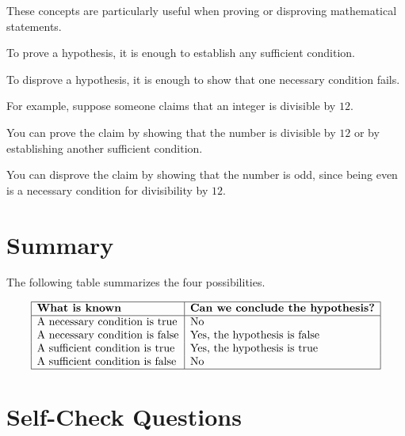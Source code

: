 \documentclass{essay}
\begin{document}
These concepts are particularly useful when proving or disproving mathematical statements.

To prove a hypothesis, it is enough to establish any sufficient condition.

To disprove a hypothesis, it is enough to show that one necessary condition fails.

For example, suppose someone claims that an integer is divisible by \(12\).

You can prove the claim by showing that the number is divisible by \(12\) or by establishing another sufficient condition.

You can disprove the claim by showing that the number is odd, since being even is a necessary condition for divisibility by \(12\).

\section*{Summary}

The following table summarizes the four possibilities.

\[
  \begin{array}{|l|l|}
    \hline
    \textbf{What is known} & \textbf{Can we conclude the hypothesis?} \\
    \hline
    \text{A necessary condition is true} & \text{No} \\
    \text{A necessary condition is false} & \text{Yes, the hypothesis is false} \\
    \text{A sufficient condition is true} & \text{Yes, the hypothesis is true} \\
    \text{A sufficient condition is false} & \text{No} \\
    \hline
  \end{array}
\]

\section*{Self-Check Questions}
\end{document}
